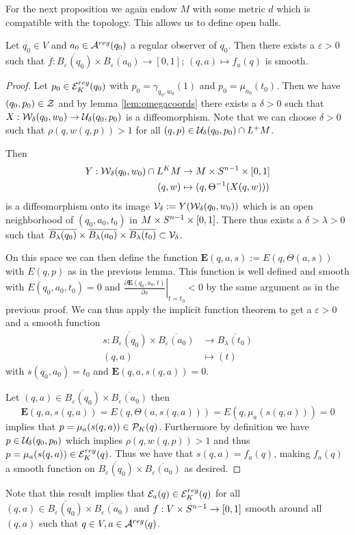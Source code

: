 For the next proposition we again endow $M$ with some metric $d$ which is compatible with the topology. This allows us to define open balls.
\begin{proposition}\label{prop:fsmooth}
    Let $q_0\in V$ and $a_0\in {{\mathcal{A}}^{reg}}(q_0)$ a regular observer of $q_0$. Then there exists a $\varepsilon>0$ such that $f:\overline{B_\varepsilon(q_0)}\times \overline{B_\varepsilon(a_0)} \to [0,1]; \, (q,a)\mapsto f_a(q)$ is smooth.
\end{proposition}
\begin{proof}
    Let $p_0 \in {{\mathcal{E}}^{reg}_K}(q_0)$ with $p_0 = \gamma_{q_0,w_0}(1)$ and $p_0 = \mu_{a_0}(t_0)$. Then we have $(q_0,p_0)\in {\mathcal{Z}}$ and by lemma \ref{lem:omegacoords} there exists a $\delta>0$ such that $X:{\mathcal{W}}_\delta(q_0,w_0)\to {\mathcal{U}}_\delta(q_0,p_0)$ is a diffeomorphism. Note that we can choose $\delta>0$ such that $\rho(q,w(q,p))>1$ for all $(q,p)\in {\mathcal{U}}_\delta(q_0,p_0) \cap L^+M$.

    Then 
    \begin{align*}
        Y:{\mathcal{W}}_\delta(q_0,w_0) \cap L^KM&\to M\times {S^{n-1}} \times [0,1]\\
        (q,w) &\mapsto (q,\Theta^{-1}(X(q,w)))
    \end{align*} 
    is a diffeomorphism onto its image ${\mathcal{V}}_\delta:=Y({\mathcal{W}}_\delta(q_0,w_0))$  which is an open neighborhood of $(q_0,a_0,t_0)$ in $M\times {S^{n-1}} \times [0,1]$. There thus exists a $\delta > \lambda>0$ such that $\overline{B_\lambda(q_0)}\times\overline{B_\lambda(a_0)} \times\overline{B_\lambda(t_0)} \subset {\mathcal{V}}_\delta$.

    On this space we can then define the function $\mathbf{E}(q,a,s):=E(q,\Theta(a,s))$ with $E(q,p)$ as in the previous lemma. This function is well defined and smooth with $E(q_0,a_0,t_0)=0$ and $\left.\frac{\partial\mathbf{E}(q_0,a_0,t)}{\partial s}\right\rvert_{t=t_0} < 0$ by the same argument as in the previous proof. We can thus apply the implicit function theorem to get a $\varepsilon>0$ and a smooth function 
    \begin{align*}
        s:\overline{B_\varepsilon(q_0)}\times\overline{B_\varepsilon(a_0)} &\to \overline{B_\lambda(t_0)}\\
        (q,a)&\mapsto (t)
    \end{align*} with $s(q_0,a_0)=t_0$ and $\mathbf{E}(q,a,s(q,a))=0$.

    Let $(q,a) \in \overline{B_\varepsilon(q_0)}\times\overline{B_\varepsilon(a_0)}$ then 
    \[
        \mathbf{E}(q,a,s(q,a))=E(q,\Theta(a,s(q,a))) = E(q,\mu_a(s(q,a))) = 0
    \] 
    implies that $p=\mu_a(s(q,a))\in {\mathcal{P}}_K(q)$. Furthermore by definition we have $p\in {\mathcal{U}}_\delta(q_0,p_0)$ which implies $\rho(q,w(q,p))>1$ and thus $p=\mu_a(s(q,a))\in {{\mathcal{E}}^{reg}_K}(q)$. Thus we have that $s(q,a)=f_a(q)$, making $f_a(q)$ a smooth function on $\overline{B_\varepsilon(q_0)}\times\overline{B_\varepsilon(a_0)}$ as desired.
\end{proof} 
Note that this result implies that ${\mathcal{E}}_a(q)\in {{\mathcal{E}}^{reg}_K}(q)$ for all $(q,a)\in \overline{B_\varepsilon(q_0)}\times\overline{B_\varepsilon(a_0)}$ and $f:V\times {S^{n-1}} \to [0,1]$ smooth around all $(q,a)$ such that $q\in V, a\in {{\mathcal{A}}^{reg}}(q)$.

